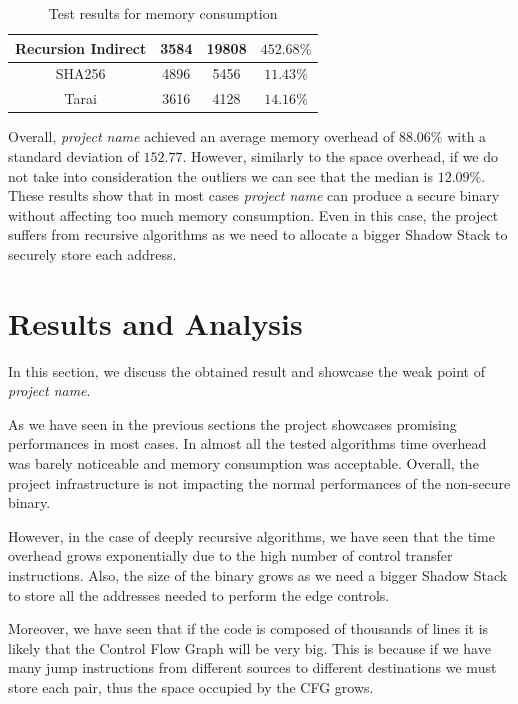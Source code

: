 \begin{table}
\begin{tabular}{|c|c|c|c|}
    \hline
    Recursion Indirect          & 3584                         & 19808                        & $452.68\%$               \\
    \hline
    SHA256                      & 4896                         & 5456                         & $11.43\%$                \\
    \hline
    Tarai                       & 3616                         & 4128                         & $14.16\%$                \\
    \hline
  \end{tabular}
  \caption{Test results for memory consumption}
  \label{tab:binsize}
\end{table}

Overall, \textit{project name} achieved an average memory overhead of $88.06\%$ with
a standard deviation of $152.77$. However, similarly to the space overhead, if
we do not take into consideration the outliers we can see that the median is
$1 2.09\%$. These results show that in most cases \textit{project name} can
produce a secure binary without affecting too much memory consumption. Even in this
case, the project suffers from recursive algorithms as we need to allocate a
bigger Shadow Stack to securely store each address.

\section{Results and Analysis}
\label{sec:pa_results}

In this section, we discuss the obtained result and showcase the weak point of
\textit{project name}.

As we have seen in the previous sections the project showcases promising performances
in most cases. In almost all the tested algorithms time overhead was barely
noticeable and memory consumption was acceptable. Overall, the project
infrastructure is not impacting the normal performances of the non-secure binary.

However, in the case of deeply recursive algorithms, we have seen that the time
overhead grows exponentially due to the high number of control transfer
instructions. Also, the size of the binary grows as we need a bigger Shadow
Stack to store all the addresses needed to perform the edge controls.

Moreover, we have seen that if the code is composed of thousands of lines it is likely
that the Control Flow Graph will be very big. This is because if we have many
jump instructions from different sources to different destinations we must store
each pair, thus the space occupied by the CFG grows.

